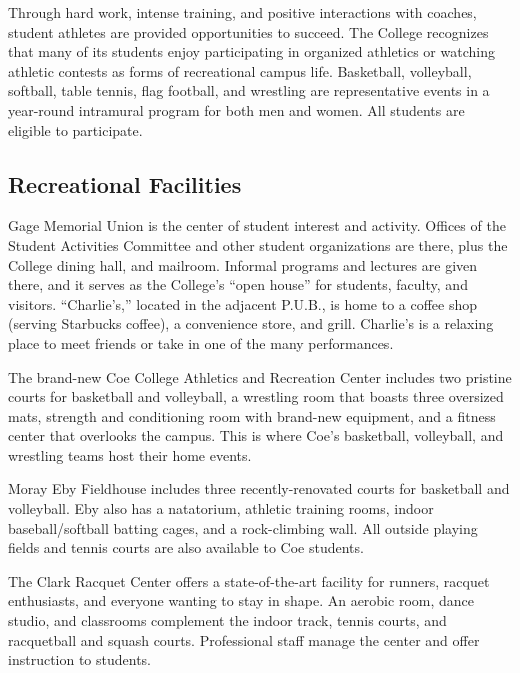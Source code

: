 \documentclass[
  letterpaper,
]{scrbook}
\renewcommand{\part}[1]{\addcontentsline{toc}{part}{#1}}
\begin{document}
Through hard work, intense training, and positive interactions with
coaches, student athletes are provided opportunities to succeed. The
College recognizes that many of its students enjoy participating in
organized athletics or watching athletic contests as forms of
recreational campus life. Basketball, volleyball, softball, table
tennis, flag football, and wrestling are representative events in a
year-round intramural program for both men and women. All students are
eligible to participate.

\subsection{Recreational Facilities}\label{recreational-facilities}

Gage Memorial Union is the center of student interest and activity.
Offices of the Student Activities Committee and other student
organizations are there, plus the College dining hall, and mailroom.
Informal programs and lectures are given there, and it serves as the
College's ``open house'' for students, faculty, and visitors.
``Charlie's,'' located in the adjacent P.U.B., is home to a coffee shop
(serving Starbucks coffee), a convenience store, and grill. Charlie's is
a relaxing place to meet friends or take in one of the many
performances.

The brand-new Coe College Athletics and Recreation Center includes two
pristine courts for basketball and volleyball, a wrestling room that
boasts three oversized mats, strength and conditioning room with
brand-new equipment, and a fitness center that overlooks the campus.
This is where Coe's basketball, volleyball, and wrestling teams host
their home events.

Moray Eby Fieldhouse includes three recently-renovated courts for
basketball and volleyball. Eby also has a natatorium, athletic training
rooms, indoor baseball/softball batting cages, and a rock-climbing wall.
All outside playing fields and tennis courts are also available to Coe
students.

The Clark Racquet Center offers a state-of-the-art facility for runners,
racquet enthusiasts, and everyone wanting to stay in shape. An aerobic
room, dance studio, and classrooms complement the indoor track, tennis
courts, and racquetball and squash courts. Professional staff manage the
center and offer instruction to students.

\part{COLLEGE REGULATIONS}
\end{document}
